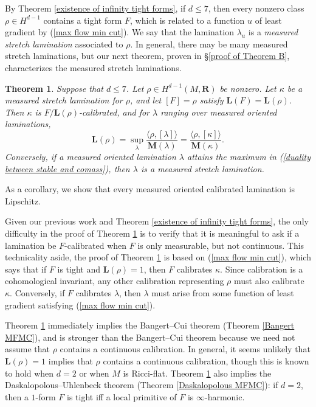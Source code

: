 \documentclass[reqno,11pt]{amsart}
\newcommand{\RR}{\mathbf{R}}
\newcommand{\Mass}{\mathbf M}
\newcommand{\Comass}{\mathbf L}
\newcommand{\dfn}[1]{\emph{#1}\index{#1}}
\newtheorem{mainthm}{Theorem}
\theoremstyle{definition}
\numberwithin{equation}{section}
\begin{document}
By Theorem \ref{existence of infinity tight forms}, if $d \leq 7$, then every nonzero class $\rho \in H^{d - 1}$ contains a tight form $F$, which is related to a function $u$ of least gradient by (\ref{max flow min cut}).
We say that the lamination $\lambda_u$ is a \dfn{measured stretch lamination} associated to $\rho$.
In general, there may be many measured stretch laminations, but our next theorem, proven in \S\ref{proof of Theorem B}, characterizes the measured stretch laminations.

\begin{mainthm}\label{lams are calibrated}
Suppose that $d \leq 7$.
Let $\rho \in H^{d - 1}(M, \RR)$ be nonzero.
Let $\kappa$ be a measured stretch lamination for $\rho$, and let $[F] = \rho$ satisfy $\Comass(F) = \Comass(\rho)$.
Then $\kappa$ is $F/\Comass(\rho)$-calibrated, and for $\lambda$ ranging over measured oriented laminations,
\begin{equation}\label{duality between stable and comass}
\Comass(\rho) = \sup_\lambda \frac{\langle \rho, [\lambda]\rangle}{\Mass(\lambda)} = \frac{\langle \rho, [\kappa]\rangle}{\Mass(\kappa)}.
\end{equation}
Conversely, if a measured oriented lamination $\lambda$ attains the maximum in (\ref{duality between stable and comass}), then $\lambda$ is a measured stretch lamination.
\end{mainthm}

As a corollary, we show that every measured oriented calibrated lamination is Lipschitz.

Given our previous work \cite{BackusCML} and Theorem \ref{existence of infinity tight forms}, the only difficulty in the proof of Theorem \ref{lams are calibrated} is to verify that it is meaningful to ask if a lamination be $F$-calibrated when $F$ is only measurable, but not continuous.
This technicality aside, the proof of Theorem \ref{lams are calibrated} is based on (\ref{max flow min cut}), which says that if $F$ is tight and $\Comass(\rho) = 1$, then $F$ calibrates $\kappa$.
Since calibration is a cohomological invariant, any other calibration representing $\rho$ must also calibrate $\kappa$.
Conversely, if $F$ calibrates $\lambda$, then $\lambda$ must arise from some function of least gradient satisfying (\ref{max flow min cut}).

Theorem \ref{lams are calibrated} immediately implies the Bangert--Cui theorem (Theorem \ref{Bangert MFMC}), and is stronger than the Bangert--Cui theorem because we need not assume that $\rho$ contains a continuous calibration.
In general, it seems unlikely that $\Comass(\rho) = 1$ implies that $\rho$ contains a continuous calibration, though this is known to hold when $d = 2$ \cite{Evans08} or when $M$ is Ricci-flat. 
Theorem \ref{lams are calibrated} also implies the Daskalopolous--Uhlenbeck theorem (Theorem \ref{Daskalopolous MFMC}): if $d = 2$, then a $1$-form $F$ is tight iff a local primitive of $F$ is $\infty$-harmonic.
\end{document}
